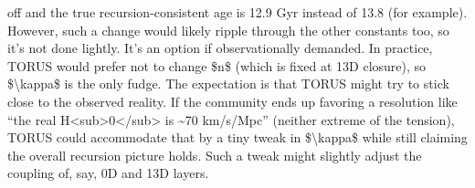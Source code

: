 \documentclass[]{article}
\begin{document}
\begin{enumerate}
  off and the true recursion-consistent age is 12.9 Gyr instead of 13.8
  (for example). However, such a change would likely ripple through the
  other constants too, so it's not done lightly. It's an option if
  observationally demanded. In practice, TORUS would prefer not to
  change \$n\$ (which is fixed at 13D closure), so
  \$\textbackslash{}kappa\$ is the only fudge. The expectation is that
  TORUS might try to stick close to the observed reality. If the
  community ends up favoring a resolution like ``the real
  H\textless{}sub\textgreater{}0\textless{}/sub\textgreater{} is
  \textasciitilde{}70 km/s/Mpc'' (neither extreme of the tension), TORUS
  could accommodate that by a tiny tweak in \$\textbackslash{}kappa\$
  while still claiming the overall recursion picture holds​. Such a
  tweak might slightly adjust the coupling of, say, 0D and 13D layers.
\end{enumerate}
\end{document}
